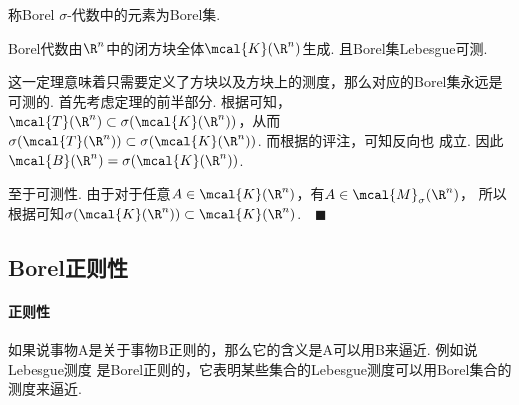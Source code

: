   \begin{defi}[Borel集]
    称Borel $\sigma$-代数中的元素为Borel集.
  \end{defi}

  \begin{thm}
    Borel代数由$\R^n$中的闭方块全体$\mcal{K}(\R^n)$生成. 且Borel集Lebesgue可测.
  \end{thm}
  \remark
    这一定理意味着只需要定义了方块以及方块上的测度，那么对应的Borel集永远是可测的.
  \proof
    首先考虑定理的前半部分. 根据可知，$\mcal{T}(\R^n)
    \subset\sigma(\mcal{K}(\R^n))$，从而$\sigma(\mcal{T}(\R^n))\subset
    \sigma(\mcal{K}(\R^n))$. 而根据的评注，可知反向也
    成立. 因此$\mcal{B}(\R^n) = \sigma(\mcal{K}(\R^n))$.\par
    至于可测性. 由于对于任意$A\in\mcal{K}(\R^n)$，有$A\in\mcal{M}_\sigma(\R^n)$，
    所以根据可知$\sigma(\mcal{K}(\R^n))\subset
    \mcal{K}(\R^n)$.$\quad\blacksquare$

\subsection{Borel正则性}

  \paragraph{正则性}
    如果说事物A是关于事物B正则的，那么它的含义是A可以用B来逼近. 例如说Lebesgue测度
    是Borel正则的，它表明某些集合的Lebesgue测度可以用Borel集合的测度来逼近.

